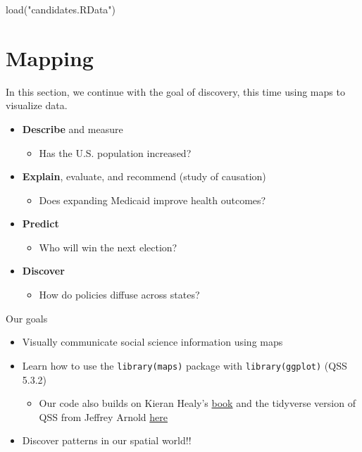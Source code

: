 \documentclass[
  letterpaper,
  DIV=11,
  numbers=noendperiod]{scrreprt}
\newenvironment{Shaded}{\begin{snugshade}}{\end{snugshade}}
\newcommand{\FunctionTok}[1]{\textcolor[rgb]{0.28,0.35,0.67}{#1}}
\newcommand{\NormalTok}[1]{\textcolor[rgb]{0.00,0.23,0.31}{#1}}
\newcommand{\StringTok}[1]{\textcolor[rgb]{0.13,0.47,0.30}{#1}}
\providecommand{\tightlist}{%
  \setlength{\itemsep}{0pt}\setlength{\parskip}{0pt}}\usepackage{longtable,booktabs,array}
\begin{document}
\begin{Shaded}
\begin{Highlighting}[]
\FunctionTok{load}\NormalTok{(}\StringTok{"candidates.RData"}\NormalTok{)}
\end{Highlighting}
\end{Shaded}


\hypertarget{maps}{%
\chapter{Mapping}\label{maps}}

In this section, we continue with the goal of discovery, this time using
maps to visualize data.

\begin{itemize}
\tightlist
\item
  \textbf{Describe} and measure

  \begin{itemize}
  \tightlist
  \item
    Has the U.S. population increased?
  \end{itemize}
\item
  \textbf{Explain}, evaluate, and recommend (study of causation)

  \begin{itemize}
  \tightlist
  \item
    Does expanding Medicaid improve health outcomes?
  \end{itemize}
\item
  \textbf{Predict}

  \begin{itemize}
  \tightlist
  \item
    Who will win the next election?
  \end{itemize}
\item
  \textbf{Discover}

  \begin{itemize}
  \tightlist
  \item
    How do policies diffuse across states?
  \end{itemize}
\end{itemize}

Our goals

\begin{itemize}
\tightlist
\item
  Visually communicate social science information using maps
\item
  Learn how to use the \texttt{library(maps)} package with
  \texttt{library(ggplot)} (QSS 5.3.2)

  \begin{itemize}
  \tightlist
  \item
    Our code also builds on Kieran Healy's
    \href{https://socviz.co/maps.html\#maps}{book} and the tidyverse
    version of QSS from Jeffrey Arnold
    \href{https://jrnold.github.io/qss-tidy/discovery.html}{here}
  \end{itemize}
\item
  Discover patterns in our spatial world!!
\end{itemize}
\end{document}
